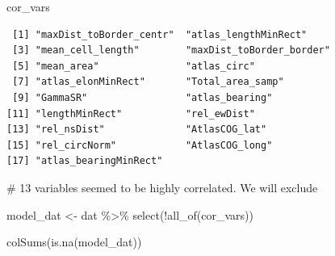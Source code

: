 \documentclass[
  letterpaper,
  DIV=11,
  numbers=noendperiod]{scrartcl}
\newenvironment{Shaded}{\begin{snugshade}}{\end{snugshade}}
\newcommand{\CommentTok}[1]{\textcolor[rgb]{0.37,0.37,0.37}{#1}}
\newcommand{\FunctionTok}[1]{\textcolor[rgb]{0.28,0.35,0.67}{#1}}
\newcommand{\NormalTok}[1]{\textcolor[rgb]{0.00,0.23,0.31}{#1}}
\newcommand{\OtherTok}[1]{\textcolor[rgb]{0.00,0.23,0.31}{#1}}
\newcommand{\SpecialCharTok}[1]{\textcolor[rgb]{0.37,0.37,0.37}{#1}}
\begin{document}
\begin{Shaded}
\begin{Highlighting}[]
\NormalTok{cor\_vars}
\end{Highlighting}
\end{Shaded}

\begin{verbatim}
 [1] "maxDist_toBorder_centr"  "atlas_lengthMinRect"    
 [3] "mean_cell_length"        "maxDist_toBorder_border"
 [5] "mean_area"               "atlas_circ"             
 [7] "atlas_elonMinRect"       "Total_area_samp"        
 [9] "GammaSR"                 "atlas_bearing"          
[11] "lengthMinRect"           "rel_ewDist"             
[13] "rel_nsDist"              "AtlasCOG_lat"           
[15] "rel_circNorm"            "AtlasCOG_long"          
[17] "atlas_bearingMinRect"   
\end{verbatim}

\begin{Shaded}
\begin{Highlighting}[]
\CommentTok{\# 13 variables seemed to be highly correlated. We will exclude}

\NormalTok{model\_dat }\OtherTok{\textless{}{-}}\NormalTok{ dat }\SpecialCharTok{\%\textgreater{}\%}
    \FunctionTok{select}\NormalTok{(}\SpecialCharTok{!}\FunctionTok{all\_of}\NormalTok{(cor\_vars))}

\FunctionTok{colSums}\NormalTok{(}\FunctionTok{is.na}\NormalTok{(model\_dat))}
\end{Highlighting}
\end{Shaded}
\end{document}
